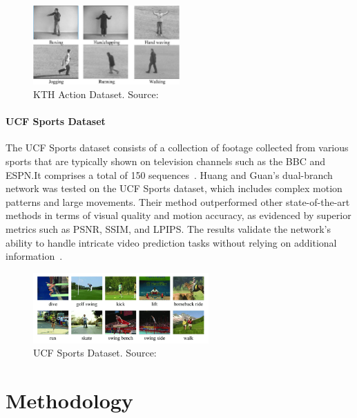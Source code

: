 \documentclass[12pt,oneside]{book} %
\begin{document}
\begin{figure}[H]
    \centering
    \includegraphics[width=0.5\textwidth]{figures/KTH-dataset.png}
    \caption{KTH Action Dataset. Source:~\citet{KTH}}\label{fig:kth-action-dataset}
\end{figure}

\subsubsection*{UCF Sports Dataset}

The UCF Sports dataset consists of a collection of footage collected from
various sports that are typically shown on television channels such as the BBC
and ESPN.\@ It comprises a total of 150 sequences~\cite{UCFSport}. Huang and
Guan's dual-branch network was tested on the UCF Sports dataset, which includes
complex motion patterns and large movements. Their method outperformed other
state-of-the-art methods in terms of visual quality and motion accuracy, as
evidenced by superior metrics such as PSNR, SSIM, and LPIPS. The results
validate the network's ability to handle intricate video prediction tasks
without relying on additional information~\cite{
    DualBranchSpatialTemporalLearningNetworkVideoPrediction}.

\begin{figure}[H]
    \centering
    \includegraphics[width=0.6\textwidth]{figures/ucf-sport-dataset.png}
    \caption{UCF Sports Dataset. Source:~\citet{UCFSport}}\label{fig:ucf-sports-dataset}
\end{figure}

\chapter{Methodology}
\end{document}
